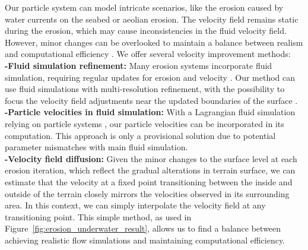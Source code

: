 Our particle system can model intricate scenarios, like the erosion caused by water currents on the seabed or aeolian erosion. The velocity field remains static during the erosion, which may cause inconsistencies in the fluid velocity field. However, minor changes can be overlooked to maintain a balance between realism and computational efficiency \cite{Tychonievich2010}. We offer several velocity improvement methods: \\
\textbf{-Fluid simulation refinement:} Many erosion systems incorporate fluid simulation, requiring regular updates for erosion and velocity \cite{Kristof2009, Wojtan2007}. Our method can use fluid simulations with multi-resolution refinement, with the possibility to focus the velocity field adjustments near the updated boundaries of the surface \cite{Roose2011}. \\
\textbf{-Particle velocities in fluid simulation:} With a Lagrangian fluid simulation relying on particle systems \cite{Koschier2022}, our particle velocities can be incorporated in its computation. This approach is only a provisional solution due to potential parameter mismatches with main fluid simulation. \\
\textbf{-Velocity field diffusion:} Given the minor changes to the surface level at each erosion iteration, which reflect the gradual alterations in terrain surface, we can estimate that the velocity at a fixed point transitioning between the inside and outside of the terrain closely mirrors the velocities observed in its surrounding area. In this context, we can simply interpolate the velocity field at any transitioning point. This simple method, as used in Figure~\ref{fig:erosion_underwater_result}, allows us to find a balance between achieving realistic flow simulations and maintaining computational efficiency.
